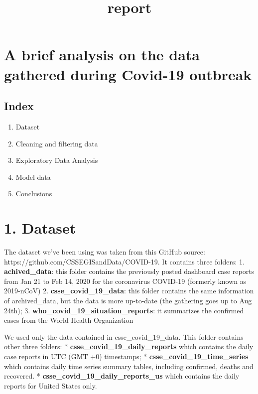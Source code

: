 \documentclass[11pt]{article}
\title{report}
\providecommand{\tightlist}{%
      \setlength{\itemsep}{0pt}\setlength{\parskip}{0pt}}
\begin{document}
    
    
    \maketitle
    
    

    
    \hypertarget{a-brief-analysis-on-the-data-gathered-during-covid-19-outbreak}{%
\section{A brief analysis on the data gathered during Covid-19
outbreak}\label{a-brief-analysis-on-the-data-gathered-during-covid-19-outbreak}}

    \hypertarget{index}{%
\subsection{Index}\label{index}}

\begin{enumerate}
\def\labelenumi{\arabic{enumi}.}
\tightlist
\item
  Dataset
\item
  Cleaning and filtering data
\item
  Exploratory Data Analysis
\item
  Model data
\item
  Conclusions
\end{enumerate}

    \hypertarget{dataset}{%
\section{1. Dataset}\label{dataset}}

The dataset we've been using was taken from this GitHub source:
https://github.com/CSSEGISandData/COVID-19. It contains three folders:
1. \textbf{achived\_data}: this folder contains the previously posted
dashboard case reports from Jan 21 to Feb 14, 2020 for the coronavirus
COVID-19 (formerly known as 2019-nCoV) 2.
\textbf{csse\_covid\_19\_data}: this folder contains the same
information of archived\_data, but the data is more up-to-date (the
gathering goes up to Aug 24th); 3.
\textbf{who\_covid\_19\_situation\_reports}: it summarizes the confirmed
cases from the World Health Organization

We used only the data contained in csse\_covid\_19\_data. This folder
contains other three folders: * \textbf{csse\_covid\_19\_daily\_reports}
which contains the daily case reports in UTC (GMT +0) timestamps; *
\textbf{csse\_covid\_19\_time\_series} which contains daily time series
summary tables, including confirmed, deaths and recovered. *
\textbf{csse\_covid\_19\_daily\_reports\_us} which contains the daily
reports for United States only.
\end{document}
